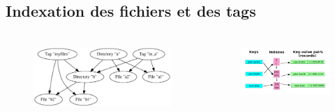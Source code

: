 \documentclass[10pt]{beamer}
\begin{document}
\subsection{Indexation des fichiers et des tags}
\begin{frame}
    \frametitle{\subsecname}
    \begin{columns}[T]
        \begin{column}{.5\textwidth}
            \begin{center}
                \begin{figure}
                    \includegraphics[width=1\textwidth]{images/graph.png}
                \end{figure}
            \end{center}
        \end{column}
        \pause
        \begin{column}{.5\textwidth}
            \begin{center}
                \begin{figure}
                    \includegraphics[width=1\textwidth]{images/hashmap_wiki.png}
                \end{figure}
            \end{center}
        \end{column}
    \end{columns}
\end{frame}
\end{document}
